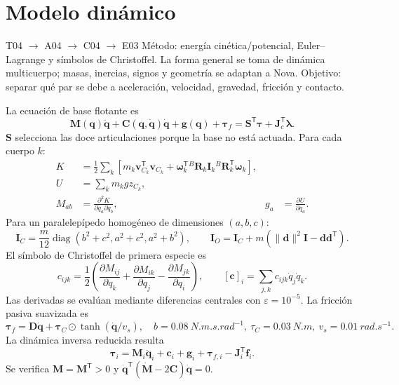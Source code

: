 \documentclass[11pt,letterpaper]{article}
\newcommand{\vect}[1]{\bm{#1}}
\newcommand{\mat}[1]{\bm{#1}}
\newcommand{\trans}{^{\mathsf T}}
\newcommand{\diag}{\operatorname{diag}}
\begin{document}
\section{Modelo dinámico}
\begin{tracebox}{T04 $\rightarrow$ A04 $\rightarrow$ C04 $\rightarrow$ E03}
Método: energía cinética/potencial, Euler--Lagrange y símbolos de Christoffel.
La forma general se toma de dinámica multicuerpo; masas, inercias, signos y
geometría se adaptan a Nova. Objetivo: separar qué par se debe a aceleración,
velocidad, gravedad, fricción y contacto.
\end{tracebox}
La ecuación de base flotante es
\begin{equation}
 \mat M(\vect q)\ddot{\vect q}+\mat C(\vect q,\dot{\vect q})\dot{\vect q}
 +\vect g(\vect q)+\vect\tau_f
 =\mat S\trans\vect\tau+\mat J_c\trans\vect\lambda.\label{eq:dynamics}
\end{equation}
$\mat S$ selecciona las doce articulaciones porque la base no está actuada.
Para cada cuerpo $k$:
\begin{align}
 K&=\frac12\sum_k\left[m_k\vect v_{C_k}\trans\vect v_{C_k}+
 \vect\omega_k\trans{}^B\mat R_k\mat I_k{}^B\mat R_k\trans\vect\omega_k\right],
 \label{eq:kinetic}\\
 U&=\sum_km_kgz_{C_k},\label{eq:potential}\\
 M_{ab}&=\frac{\partial^2K}{\partial\dot q_a\partial\dot q_b},
 &g_a&=\frac{\partial U}{\partial q_a}.\label{eq:mg}
\end{align}
Para un paralelepípedo homogéneo de dimensiones $(a,b,c)$:
\begin{equation}
 \mat I_C=\frac{m}{12}\diag(b^2+c^2,a^2+c^2,a^2+b^2),\qquad
 \mat I_O=\mat I_C+m(\|\vect d\|^2\mat I-\vect d\vect d\trans).
\end{equation}
El símbolo de Christoffel de primera especie es
\begin{equation}
 c_{ijk}=\frac12\left(\frac{\partial M_{ij}}{\partial q_k}+
 \frac{\partial M_{ik}}{\partial q_j}-\frac{\partial M_{jk}}{\partial q_i}\right),
 \qquad [\vect c]_i=\sum_{j,k}c_{ijk}\dot q_j\dot q_k.\label{eq:christoffel}
\end{equation}
Las derivadas se evalúan mediante diferencias centrales con
$\varepsilon=10^{-5}$. La fricción pasiva suavizada es
\begin{equation}
 \vect\tau_f=\mat D\dot{\vect q}+\vect\tau_C\odot
 \tanh(\dot{\vect q}/v_s),\quad
 b=\SI{0.08}{N.m.s.rad^{-1}},\ \tau_C=\SI{0.03}{N.m},\ v_s=\SI{0.01}{rad.s^{-1}}.
\end{equation}
La dinámica inversa reducida resulta
\begin{equation}
 \vect\tau_i=\mat M_i\ddot{\vect q}_i+\vect c_i+\vect g_i+
 \vect\tau_{f,i}-\mat J_i\trans\vect f_i.\label{eq:inverse-dynamics}
\end{equation}
Se verifica $\mat M=\mat M\trans>0$ y
$\dot{\vect q}\trans(\dot{\mat M}-2\mat C)\dot{\vect q}=0$.
\end{document}
